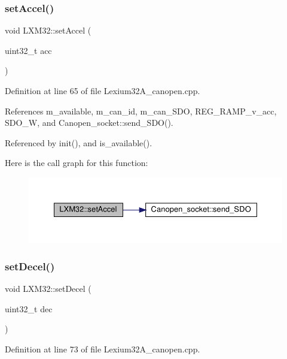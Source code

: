 \subsubsection{\texorpdfstring{set\+Accel()}{setAccel()}}
{\footnotesize\ttfamily void L\+X\+M32\+::set\+Accel (\begin{DoxyParamCaption}\item[{uint32\+\_\+t}]{acc }\end{DoxyParamCaption})}



Definition at line 65 of file Lexium32\+A\+\_\+canopen.\+cpp.



References m\+\_\+available, m\+\_\+can\+\_\+id, m\+\_\+can\+\_\+\+S\+DO, R\+E\+G\+\_\+\+R\+A\+M\+P\+\_\+v\+\_\+acc, S\+D\+O\+\_\+W, and Canopen\+\_\+socket\+::send\+\_\+\+S\+D\+O().



Referenced by init(), and is\+\_\+available().

Here is the call graph for this function\+:\nopagebreak
\begin{figure}[H]
\begin{center}
\leavevmode
\includegraphics[width=350pt]{class_l_x_m32_ab942cd394ba87efa06704e9921395692_cgraph}
\end{center}
\end{figure}
\mbox{\label{class_l_x_m32_aa1b975678f618dd2383e61bef655a353}} 
\subsubsection{\texorpdfstring{set\+Decel()}{setDecel()}}
{\footnotesize\ttfamily void L\+X\+M32\+::set\+Decel (\begin{DoxyParamCaption}\item[{uint32\+\_\+t}]{dec }\end{DoxyParamCaption})}



Definition at line 73 of file Lexium32\+A\+\_\+canopen.\+cpp.



